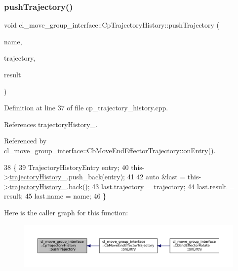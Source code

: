 \subsubsection{\texorpdfstring{push\+Trajectory()}{pushTrajectory()}}
{\footnotesize\ttfamily void cl\+\_\+move\+\_\+group\+\_\+interface\+::\+Cp\+Trajectory\+History\+::push\+Trajectory (\begin{DoxyParamCaption}\item[{std\+::string}]{name,  }\item[{const moveit\+\_\+msgs\+::\+Robot\+Trajectory \&}]{trajectory,  }\item[{moveit\+\_\+msgs\+::\+Move\+It\+Error\+Codes}]{result }\end{DoxyParamCaption})}



Definition at line 37 of file cp\+\_\+trajectory\+\_\+history.\+cpp.



References trajectory\+History\+\_\+.



Referenced by cl\+\_\+move\+\_\+group\+\_\+interface\+::\+Cb\+Move\+End\+Effector\+Trajectory\+::on\+Entry().


\begin{DoxyCode}
38     \{
39         TrajectoryHistoryEntry entry;
40         this->\hyperlink{classcl__move__group__interface_1_1CpTrajectoryHistory_ac5f17b74ca856f6f8ccb96d9a4786fb2}{trajectoryHistory\_}.push\_back(entry);
41 
42         \textcolor{keyword}{auto} &last = this->\hyperlink{classcl__move__group__interface_1_1CpTrajectoryHistory_ac5f17b74ca856f6f8ccb96d9a4786fb2}{trajectoryHistory\_}.back();
43         last.trajectory = trajectory;
44         last.result = result;
45         last.name = name;
46     \}
\end{DoxyCode}
Here is the caller graph for this function\+:
\nopagebreak
\begin{figure}[H]
\begin{center}
\leavevmode
\includegraphics[width=350pt]{classcl__move__group__interface_1_1CpTrajectoryHistory_adf3f9a3fed4ef7b1adf23a098d3451ec_icgraph}
\end{center}
\end{figure}


